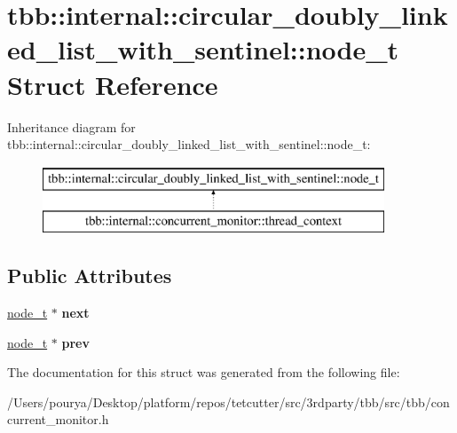 \hypertarget{structtbb_1_1internal_1_1circular__doubly__linked__list__with__sentinel_1_1node__t}{}\section{tbb\+:\+:internal\+:\+:circular\+\_\+doubly\+\_\+linked\+\_\+list\+\_\+with\+\_\+sentinel\+:\+:node\+\_\+t Struct Reference}
\label{structtbb_1_1internal_1_1circular__doubly__linked__list__with__sentinel_1_1node__t}
Inheritance diagram for tbb\+:\+:internal\+:\+:circular\+\_\+doubly\+\_\+linked\+\_\+list\+\_\+with\+\_\+sentinel\+:\+:node\+\_\+t\+:\begin{figure}[H]
\begin{center}
\leavevmode
\includegraphics[height=2.000000cm]{structtbb_1_1internal_1_1circular__doubly__linked__list__with__sentinel_1_1node__t}
\end{center}
\end{figure}
\subsection*{Public Attributes}
\begin{DoxyCompactItemize}
\item 
\hypertarget{structtbb_1_1internal_1_1circular__doubly__linked__list__with__sentinel_1_1node__t_a863d395ce3c8dbc80ab8188c1677581d}{}\hyperlink{structtbb_1_1internal_1_1circular__doubly__linked__list__with__sentinel_1_1node__t}{node\+\_\+t} $\ast$ {\bfseries next}\label{structtbb_1_1internal_1_1circular__doubly__linked__list__with__sentinel_1_1node__t_a863d395ce3c8dbc80ab8188c1677581d}

\item 
\hypertarget{structtbb_1_1internal_1_1circular__doubly__linked__list__with__sentinel_1_1node__t_ad17e50fd613a1765c28cde7e798311c2}{}\hyperlink{structtbb_1_1internal_1_1circular__doubly__linked__list__with__sentinel_1_1node__t}{node\+\_\+t} $\ast$ {\bfseries prev}\label{structtbb_1_1internal_1_1circular__doubly__linked__list__with__sentinel_1_1node__t_ad17e50fd613a1765c28cde7e798311c2}

\end{DoxyCompactItemize}


The documentation for this struct was generated from the following file\+:\begin{DoxyCompactItemize}
\item 
/\+Users/pourya/\+Desktop/platform/repos/tetcutter/src/3rdparty/tbb/src/tbb/concurrent\+\_\+monitor.\+h\end{DoxyCompactItemize}
